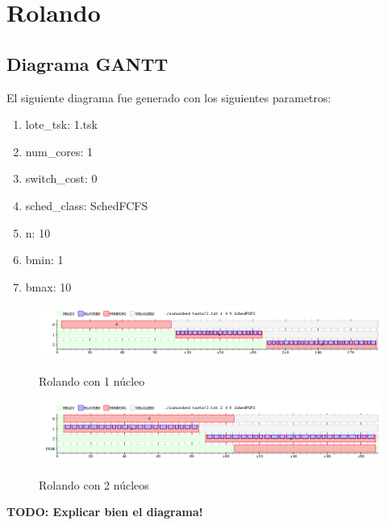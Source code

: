 \section{Rolando}

\subsection{Diagrama GANTT}

El siguiente diagrama fue generado con los siguientes parametros:

\begin{enumerate}
	\item lote\_tsk: 1.tsk
	\item num\_cores: 1
	\item switch\_cost: 0
	\item sched\_class: SchedFCFS
	\item n: 10
	\item bmin: 1
	\item bmax: 10
\end{enumerate}

\begin{figure}[h]
    \includegraphics[width=\linewidth]{images/2_1nucleo.png}
    \label{fig:Task Consola}
    \caption{Rolando con 1 núcleo}
\end{figure}

\begin{figure}[h]
    \includegraphics[width=\linewidth]{images/2_2nucleos.png}
    \label{fig:Task Consola}
    \caption{Rolando con 2 núcleos}
\end{figure}

\textbf{TODO: Explicar bien el diagrama!}